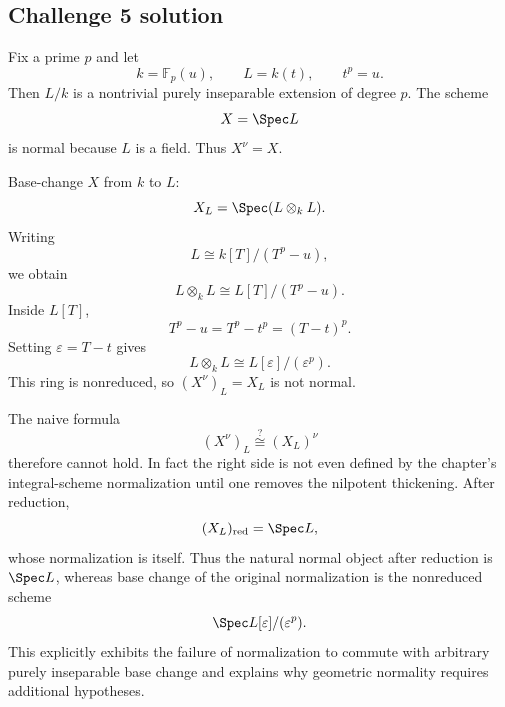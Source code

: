 \subsection*{Challenge 5 solution}
\begin{solution}
Fix a prime \(p\) and let
\[
k=\mathbb F_p(u),
\qquad
L=k(t),
\qquad
t^p=u.
\]
Then \(L/k\) is a nontrivial purely inseparable extension of degree \(p\). The scheme
\[
X=\Spec L
\]
is normal because \(L\) is a field. Thus \(X^\nu=X\).

Base-change \(X\) from \(k\) to \(L\):
\[
X_L=\Spec(L\otimes_kL).
\]
Writing
\[
L\cong k[T]/(T^p-u),
\]
we obtain
\[
L\otimes_kL
\cong
L[T]/(T^p-u).
\]
Inside \(L[T]\),
\[
T^p-u=T^p-t^p=(T-t)^p.
\]
Setting \(\varepsilon=T-t\) gives
\[
\boxed{
L\otimes_kL\cong L[\varepsilon]/(\varepsilon^p).
}
\]
This ring is nonreduced, so \((X^\nu)_L=X_L\) is not normal.

The naive formula
\[
(X^\nu)_L\stackrel?{\cong}(X_L)^\nu
\]
therefore cannot hold. In fact the right side is not even defined by the chapter's integral-scheme
normalization until one removes the nilpotent thickening. After reduction,
\[
(X_L)_{\mathrm{red}}=\Spec L,
\]
whose normalization is itself. Thus the natural normal object after reduction is \(\Spec L\), whereas base
change of the original normalization is the nonreduced scheme
\[
\Spec L[\varepsilon]/(\varepsilon^p).
\]
This explicitly exhibits the failure of normalization to commute with arbitrary purely inseparable base change
and explains why geometric normality requires additional hypotheses.
\end{solution}
